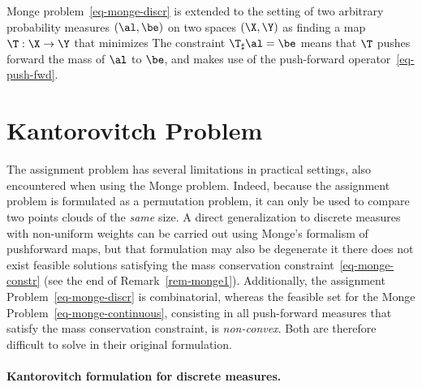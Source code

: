 Monge problem~\eqref{eq-monge-discr} is extended to the setting of two arbitrary probability measures $(\al,\be)$ on two spaces $(\X,\Y)$ as finding a map $\T : \X \rightarrow \Y$ that minimizes
The constraint $\T_\sharp \al = \be$ means that $\T$ pushes forward the mass of $\al$ to $\be$, and makes use of the push-forward operator~\eqref{eq-push-fwd}. 


\section{Kantorovitch Problem}

The assignment problem has several limitations in practical settings, also encountered when using the Monge problem. Indeed, because the assignment problem is formulated as a permutation problem, it can only be used to compare two points clouds of the \emph{same} size. A direct generalization to discrete measures with non-uniform weights can be carried out using Monge's formalism of pushforward maps, but that formulation may also be degenerate it there does not exist feasible solutions satisfying the mass conservation constraint~\eqref{eq-monge-constr} (see the end of Remark~\ref{rem-monge1}). Additionally, the assignment Problem~\eqref{eq-monge-discr} is combinatorial, whereas the feasible set for the Monge Problem~\eqref{eq-monge-continuous}, consisting in all push-forward measures that satisfy the mass conservation constraint, is \emph{non-convex}. Both are therefore difficult to solve in their original formulation.


\paragraph{Kantorovitch formulation for discrete measures.}

